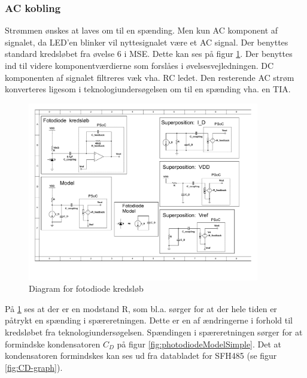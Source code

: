 \documentclass[HardwareDesign/HardwareDesign_main.tex]{subfiles}
\begin{document}
\subsubsection{AC kobling} \label{sec:CupSensorACCoupling}
Strømmen ønskes at laves om til en spænding. Men kun AC komponent af signalet, da LED'en blinker vil nyttesignalet være et AC signal. Der benyttes standard kredsløbet fra øvelse 6 i MSE\autocite[5]{MSE_EXC_6}. Dette kan ses på figur \ref{fig:photodiodeCircuit}. Der benyttes ind til videre komponentværdierne som forslåes i øvelsesvejledningen.   DC komponenten af signalet filtreres væk vha. RC ledet. Den resterende AC strøm konverteres ligesom i teknologiundersøgelsen om til en spænding vha. en TIA. 
\begin{figure}[H]
    \centering
    \includegraphics[width=0.9\textwidth,trim={0.6in 5.1in 6.0in 0.55in},clip, page=1]{HardwareDesign/CupSensor/graphics/Superposition.pdf}
    \caption{Diagram for fotodiode kredsløb}
    \label{fig:photodiodeCircuit}
\end{figure}
På \ref{fig:photodiodeCircuit} ses at der er en modstand R, som bl.a. sørger for at der hele tiden er påtrykt en spænding i spæreretningen. Dette er en af ændringerne i forhold til kredsløbet fra teknologiundersøgelsen. Spændingen i spæreretningen sørger for at formindske kondensatoren $C_D$ på figur \ref{fig:photodiodeModelSimple}. Det at kondensatoren formindskes kan ses ud fra databladet for SFH485 (se figur \ref{fig:CD-graph}).
\end{document}
